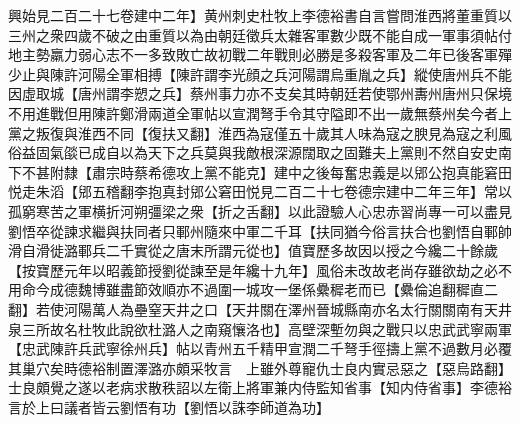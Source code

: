 興始見二百二十七卷建中二年】黄州刺史杜牧上李德裕書自言嘗問淮西將董重質以三州之衆四歲不破之由重質以為由朝廷徵兵太雜客軍數少既不能自成一軍事須帖付地主勢羸力弱心志不一多致敗亡故初戰二年戰則必勝是多殺客軍及二年已後客軍殫少止與陳許河陽全軍相搏【陳許謂李光顔之兵河陽謂烏重胤之兵】縱使唐州兵不能因虛取城【唐州謂李愬之兵】蔡州事力亦不支矣其時朝廷若使鄂州夀州唐州只保境不用進戰但用陳許鄭滑兩道全軍帖以宣潤弩手令其守隘即不出一歲無蔡州矣今者上黨之叛復與淮西不同【復扶又翻】淮西為寇僅五十歲其人味為寇之腴見為寇之利風俗益固氣燄已成自以為天下之兵莫與我敵根深源闊取之固難夫上黨則不然自安史南下不甚附隸【肅宗時蔡希德攻上黨不能克】建中之後每奮忠義是以郳公抱真能窘田悦走朱滔【郳五稽翻李抱真封郳公窘田悦見二百二十七卷德宗建中二年三年】常以孤窮寒苦之軍横折河朔彊梁之衆【折之舌翻】以此證驗人心忠赤習尚專一可以盡見劉悟卒從諫求繼與扶同者只鄆州隨來中軍二千耳【扶同猶今俗言扶合也劉悟自鄆帥滑自滑徙潞鄆兵二千實從之唐末所謂元從也】值寶歷多故因以授之今纔二十餘歲【按寶歷元年以昭義節授劉從諫至是年纔十九年】風俗未改故老尚存雖欲劫之必不用命今成德魏博雖盡節效順亦不過圍一城攻一堡係纍穉老而已【纍倫追翻穉直二翻】若使河陽萬人為壘窒天井之口【天井關在澤州晉城縣南亦名太行關關南有天井泉三所故名杜牧此說欲杜潞人之南窺懹洛也】高壁深塹勿與之戰只以忠武武寧兩軍【忠武陳許兵武寧徐州兵】帖以青州五千精甲宣潤二千弩手徑擣上黨不過數月必覆其巢穴矣時德裕制置澤潞亦頗采牧言　上雖外尊寵仇士良内實忌惡之【惡烏路翻】士良頗覺之遂以老病求散秩詔以左衛上將軍兼内侍監知省事【知内侍省事】李德裕言於上曰議者皆云劉悟有功【劉悟以誅李師道為功】


